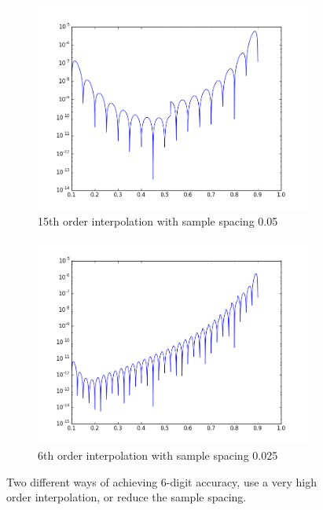 \documentclass[11pt]{article}
\begin{document}
         \pagebreak
  \begin{figure}
        \centering
        \begin{subfigure}{.5\textwidth}
  \centering
        \includegraphics[width=\linewidth]{q7/err_16.png}
                \caption{15th order interpolation with sample spacing 0.05}
                \label{fig:q7_err16}
                \end{subfigure}%
\begin{subfigure}{.5\textwidth}
  \centering
        \includegraphics[width=\linewidth]{q7/err_over.png}
                \caption{6th order interpolation with sample spacing 0.025}
                \label{fig:q7_err_over}
	\end{subfigure}
            
\caption{Two different ways of achieving 6-digit accuracy, use a very high order interpolation, or reduce the sample spacing.}
\label{fig:q7}            
\end{figure}
\end{document}
